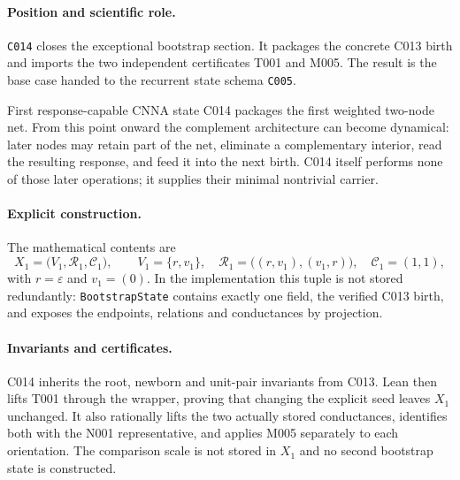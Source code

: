 
\paragraph*{Position and scientific role.}
\texttt{C014} closes the exceptional bootstrap section.  It packages the
concrete C013 birth and imports the two independent certificates T001 and M005.
The result is the base case handed to the recurrent state schema \texttt{C005}.

\begin{cnnaInfoBox}{First response-capable CNNA state}
C014 packages the first weighted two-node net.  From this point onward the complement architecture can become dynamical: later nodes may retain part of the net, eliminate a complementary interior, read the resulting response, and feed it into the next birth.  C014 itself performs none of those later operations; it supplies their minimal nontrivial carrier.
\end{cnnaInfoBox}

\paragraph*{Explicit construction.}
The mathematical contents are
\begin{equation}
  X_1=\bigl(V_1,\mathcal R_1,\mathcal C_1\bigr),
  \qquad
  V_1=\{r,v_1\},
  \quad
  \mathcal R_1=\bigl((r,v_1),(v_1,r)\bigr),
  \quad
  \mathcal C_1=(1,1),
  \label{eq:c014-bootstrap-state}
\end{equation}
with $r=\varepsilon$ and $v_1=(0)$.  In the implementation this tuple is not
stored redundantly: \texttt{BootstrapState} contains exactly one field, the
verified C013 birth, and exposes the endpoints, relations and conductances by
projection.

\paragraph*{Invariants and certificates.}
C014 inherits the root, newborn and unit-pair invariants from C013.  Lean then
lifts T001 through the wrapper, proving that changing the explicit seed leaves
$X_1$ unchanged.  It also rationally lifts the two actually stored conductances,
identifies both with the N001 representative, and applies M005 separately to
each orientation.  The comparison scale is not stored in $X_1$ and no second
bootstrap state is constructed.

